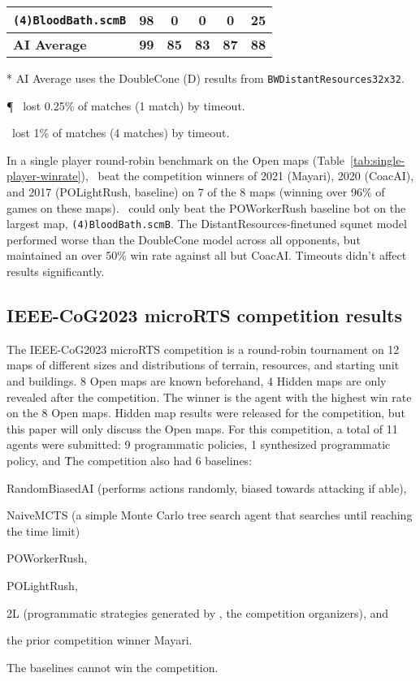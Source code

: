 \documentclass{article}
\begin{document}
\begin{table}[ht]
\begin{threeparttable}
\begin{tabular}{lcccc|c}
    \texttt{(4)BloodBath.scmB} & \textbf{98} & 0 & 0 & 0 & 25\tnote{\dag} \\
    \hline
    \textbf{AI Average}\tnote{*} & \textbf{99} & \textbf{85} & \textbf{83} & \textbf{87} & \textbf{88} \\
    \end{tabular}
    \begin{tablenotes}
    \item[*] AI Average uses the DoubleCone (D) results from \texttt{BWDistantResources32x32}.
    \item[\P] \agentName\ lost 0.25\% of matches (1 match) by timeout.
    \item[\dag] \agentName\ lost  1\% of matches (4 matches) by timeout.
    \end{tablenotes}
    \end{threeparttable}
\end{table}

In a single player round-robin benchmark on the Open maps (Table~\ref{tab:single-player-winrate}), \agentName\
beat the competition winners of 2021 (Mayari), 2020 (CoacAI), and 2017 (POLightRush,
baseline) on 7 of the 8 maps (winning over 96\% of games on these maps). \agentName\
could only beat the POWorkerRush baseline bot on the largest map,
\texttt{(4)BloodBath.scmB}. The DistantResources-finetuned squnet model performed worse than the DoubleCone model
across all opponents, but maintained an over 50\% win rate against all but CoacAI. Timeouts didn't affect results significantly.

\subsection{IEEE-CoG2023 microRTS competition results}
The IEEE-CoG2023 microRTS competition is a round-robin tournament on 12 maps of
different sizes and distributions of terrain, resources, and starting unit and
buildings. 8 Open maps are known beforehand, 4 Hidden maps are only revealed after the
competition. The winner is the agent with the highest win rate on the 8 Open maps.
Hidden map results were released for the competition, but this paper will only discuss
the Open maps. For
this competition, a total of 11 agents were submitted: 9 programmatic policies, 1
synthesized programmatic policy, and \agentName\. The competition also had 6
baselines:
\begin{inparaenum}[(1)]
    \item RandomBiasedAI (performs actions randomly, biased towards attacking if able),
    \item NaiveMCTS (a simple Monte Carlo tree search agent that searches until reaching
    the time limit)
    \item POWorkerRush,
    \item POLightRush,
    \item 2L (programmatic strategies generated by \citet{Moraes2023ChoosingWY}, the
    competition organizers), and
    \item the prior competition winner Mayari.
\end{inparaenum}
The baselines cannot win the competition.
\end{document}
